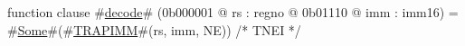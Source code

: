 function clause #\hyperref[zdecode]{decode}# (0b000001 @ rs : regno @ 0b01110 @ imm : imm16) =
  #\hyperref[zSome]{Some}#(#\hyperref[zTRAPIMM]{TRAPIMM}#(rs, imm, NE)) /* TNEI */
